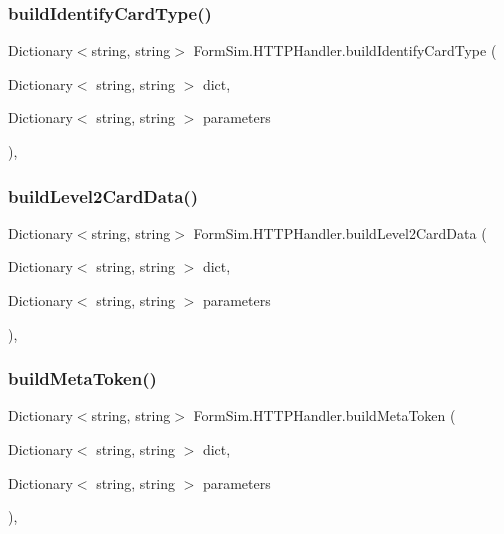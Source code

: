 \subsubsection{\texorpdfstring{build\+Identify\+Card\+Type()}{buildIdentifyCardType()}}
{\footnotesize\ttfamily Dictionary$<$string, string$>$ Form\+Sim.\+H\+T\+T\+P\+Handler.\+build\+Identify\+Card\+Type (\begin{DoxyParamCaption}\item[{Dictionary$<$ string, string $>$}]{dict,  }\item[{Dictionary$<$ string, string $>$}]{parameters }\end{DoxyParamCaption})\hspace{0.3cm}{\ttfamily [inline]}, {\ttfamily [private]}}

\mbox{\label{class_form_sim_1_1_h_t_t_p_handler_af87ed1f553edd56103a99eb9fca49ce5}} 
\subsubsection{\texorpdfstring{build\+Level2\+Card\+Data()}{buildLevel2CardData()}}
{\footnotesize\ttfamily Dictionary$<$string, string$>$ Form\+Sim.\+H\+T\+T\+P\+Handler.\+build\+Level2\+Card\+Data (\begin{DoxyParamCaption}\item[{Dictionary$<$ string, string $>$}]{dict,  }\item[{Dictionary$<$ string, string $>$}]{parameters }\end{DoxyParamCaption})\hspace{0.3cm}{\ttfamily [inline]}, {\ttfamily [private]}}

\mbox{\label{class_form_sim_1_1_h_t_t_p_handler_a709759915daafeaf76b70ed470f07b33}} 
\subsubsection{\texorpdfstring{build\+Meta\+Token()}{buildMetaToken()}}
{\footnotesize\ttfamily Dictionary$<$string, string$>$ Form\+Sim.\+H\+T\+T\+P\+Handler.\+build\+Meta\+Token (\begin{DoxyParamCaption}\item[{Dictionary$<$ string, string $>$}]{dict,  }\item[{Dictionary$<$ string, string $>$}]{parameters }\end{DoxyParamCaption})\hspace{0.3cm}{\ttfamily [inline]}, {\ttfamily [private]}}

